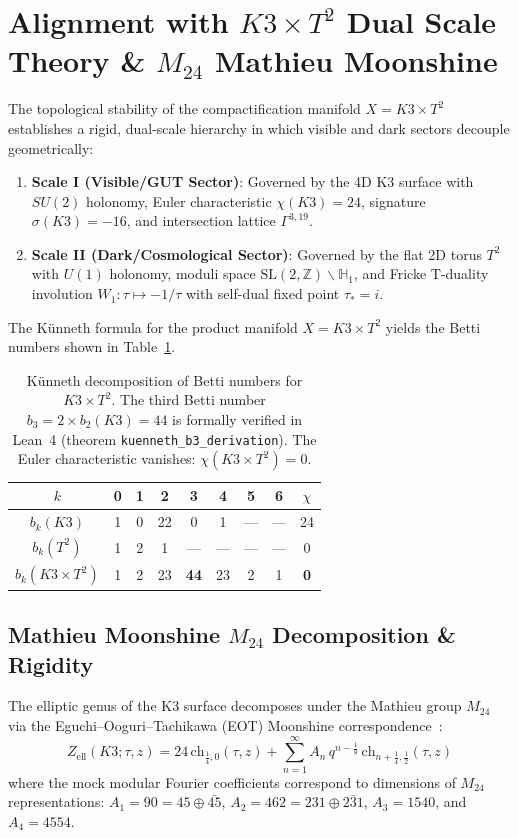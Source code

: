 \section{Alignment with $K3 \times T^2$ Dual Scale Theory \& $M_{24}$ Mathieu Moonshine}
\label{sec:dual_scale_alignment}

The topological stability of the compactification manifold $X = K3 \times T^2$ establishes a rigid, dual-scale hierarchy in which visible and dark sectors decouple geometrically:
\begin{enumerate}
    \item \textbf{Scale I (Visible/GUT Sector)}: Governed by the 4D K3 surface with $SU(2)$ holonomy, Euler characteristic $\chi(K3) = 24$, signature $\sigma(K3) = -16$, and intersection lattice $\Gamma^{3,19}$.
    \item \textbf{Scale II (Dark/Cosmological Sector)}: Governed by the flat 2D torus $T^2$ with $U(1)$ holonomy, moduli space $\text{SL}(2, \mathbb{Z})\backslash\mathbb{H}_1$, and Fricke T-duality involution $W_1: \tau \mapsto -1/\tau$ with self-dual fixed point $\tau_* = i$.
\end{enumerate}

The K\"unneth formula for the product manifold $X = K3 \times T^2$ yields the Betti numbers shown in Table~\ref{tab:kuenneth}.

\begin{table}[h]
\centering
\begin{tabular}{ccccccccc}
\toprule
$k$ & 0 & 1 & 2 & 3 & 4 & 5 & 6 & $\chi$ \\
\midrule
$b_k(K3)$ & 1 & 0 & 22 & 0 & 1 & --- & --- & 24 \\
$b_k(T^2)$ & 1 & 2 & 1 & --- & --- & --- & --- & 0 \\
$b_k(K3 \times T^2)$ & 1 & 2 & 23 & \textbf{44} & 23 & 2 & 1 & \textbf{0} \\
\bottomrule
\end{tabular}
\caption{K\"unneth decomposition of Betti numbers for $K3 \times T^2$. The third Betti number $b_3 = 2 \times b_2(K3) = 44$ is formally verified in Lean~4 (theorem \texttt{kuenneth\_b3\_derivation}). The Euler characteristic vanishes: $\chi(K3 \times T^2) = 0$.}
\label{tab:kuenneth}
\end{table}

\subsection{Mathieu Moonshine $M_{24}$ Decomposition \& Rigidity}
The elliptic genus of the K3 surface decomposes under the Mathieu group $M_{24}$ via the Eguchi--Ooguri--Tachikawa (EOT) Moonshine correspondence~\cite{Eguchi2010}:
\begin{equation}
    Z_{\text{ell}}(K3; \tau, z) = 24 \, \text{ch}_{\frac{1}{4}, 0}(\tau, z) + \sum_{n=1}^\infty A_n \, q^{n - \frac{1}{8}} \, \text{ch}_{n + \frac{1}{4}, \frac{1}{2}}(\tau, z)
    \label{eq:eot_moonshine}
\end{equation}
where the mock modular Fourier coefficients correspond to dimensions of $M_{24}$ representations: $A_1 = 90 = 45 \oplus \bar{45}$, $A_2 = 462 = 231 \oplus \bar{231}$, $A_3 = 1540$, and $A_4 = 4554$.


